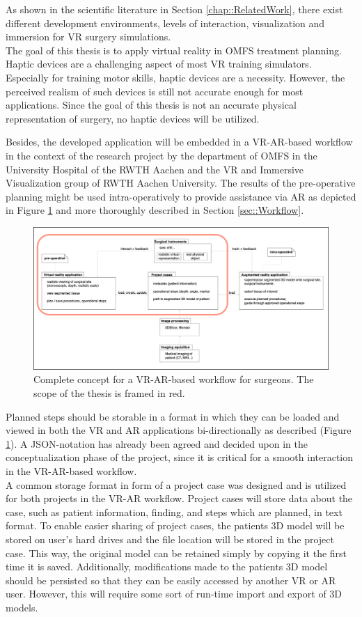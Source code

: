 As shown in the scientific literature in Section \ref{chap::RelatedWork}, there exist different development environments, levels of interaction, visualization and immersion for VR surgery simulations.
\\ The goal of this thesis is to apply virtual reality in OMFS treatment planning.
Haptic devices are a challenging aspect of most VR training simulators.
Especially for training motor skills, haptic devices are a necessity.
However, the perceived realism of such devices is still not accurate enough for most applications.
Since the goal of this thesis is not an accurate physical representation of surgery, no haptic devices will be utilized.

Besides, the developed application will be embedded in a VR-AR-based workflow in the context of the research project by the department of OMFS in the University 
Hospital of the RWTH Aachen and the VR and Immersive Visualization group of RWTH Aachen University.
The results of the pre-operative planning might be used intra-operatively to provide assistance via AR as depicted in Figure \ref{fig::ProjectPlan} and more thoroughly described in Section \ref{sec::Workflow}.
\begin{figure}
    \centering
    \includegraphics[width=\linewidth]{images/project_plan.png}
    \caption{\label{fig::ProjectPlan} Complete concept for a VR-AR-based workflow for surgeons. The scope of the thesis is framed in red.}
\end{figure}
Planned steps should be storable in a format in which they can be loaded and viewed in both the VR and AR applications bi-directionally as described (Figure \ref{fig::ProjectPlan}).
A JSON-notation has already been agreed and decided upon in the conceptualization phase of the project, since it is critical for a smooth 
interaction in the VR-AR-based workflow.
\\ A common storage format in form of a project case was designed and is utilized for both projects in the VR-AR workflow.
Project cases will store data about the case, such as patient information, finding, and steps which are planned, in text format.
To enable easier sharing of project cases, the patients 3D model will be stored on user's hard drives and the file location will be stored in the project case. 
This way, the original model can be retained simply by copying it the first time it is saved.
Additionally, modifications made to the patients 3D model should be persisted so that they can be easily accessed by another VR or AR user. 
However, this will require some sort of run-time import and export of 3D models.

